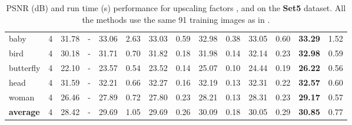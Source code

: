 \documentclass[10pt,journal,compsoc]{IEEEtran}
\begin{document}
\begin{table*}[t!]
\begin{tabular}{|l| c| c| c| c| c| c| c| c| c| c| c|c| c|}
\hline\hline
baby & 4 & 31.78 & - & 33.06 & 2.63 & 33.03 & 0.59 & 32.98 & 0.38 & 33.05 & 0.60 & \textbf{33.29} & 1.52\\
bird  & 4 & 30.18 & - &31.71 & 0.70 & 31.82 & 0.18 & 31.98 & 0.14 & 32.14 & 0.23 & \textbf{32.98} & 0.59 \\
butterfly  & 4 & 22.10 & - & 23.57 & 0.54 & 23.52 & 0.14 & 25.07 & 0.10 & 24.44 & 0.19 & \textbf{26.22} & 0.56\\
head  & 4 & 31.59 & - & 32.21 & 0.66 &32.27 & 0.16 & 32.19 & 0.13 & 32.31 & 0.22 & \textbf{32.57} & 0.60\\
woman  & 4 & 26.46 & - & 27.89 & 0.72 & 27.80 & 0.23 & 28.21 & 0.13 & 28.31 & 0.23 & \textbf{29.17} & 0.57\\
\hline\hline
\rowcolor[gray]{0.85} \textbf{average}  & 4
& 28.42 & - & 29.69 & 1.05 & 29.69 & 0.26 & 30.09 & 0.18 & 30.05 & 0.29 & \textbf{30.85} & 0.77\\
\hline
\end{tabular}\vspace*{0.2cm}
\caption{PSNR (dB) and run time (s) performance for upscaling factors ,  and  on the 
\textbf{Set5} dataset. All the methods use the same 91 training images as in \cite{ANR}.}\label{table:set5}
\vspace*{-0.5cm}
\end{table*}
\end{document}
